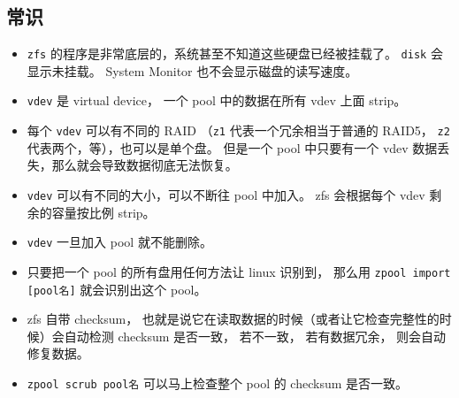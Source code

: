 \subsection{常识}
\begin{itemize}
\item \verb|zfs| 的程序是非常底层的，系统甚至不知道这些硬盘已经被挂载了。 \verb|disk| 会显示未挂载。 System Monitor 也不会显示磁盘的读写速度。
\item \verb|vdev| 是 virtual device， 一个 pool 中的数据在所有 vdev 上面 strip。
\item 每个 \verb|vdev| 可以有不同的 RAID （\verb|z1| 代表一个冗余相当于普通的 RAID5， \verb|z2| 代表两个，等），也可以是单个盘。 但是一个 pool 中只要有一个 vdev 数据丢失，那么就会导致数据彻底无法恢复。
\item \verb|vdev| 可以有不同的大小，可以不断往 pool 中加入。 zfs 会根据每个 vdev 剩余的容量按比例 strip。
\item \verb|vdev| 一旦加入 pool 就不能删除。
\item 只要把一个 pool 的所有盘用任何方法让 linux 识别到， 那么用 \verb|zpool import [pool名]| 就会识别出这个 pool。
\item zfs 自带 checksum， 也就是说它在读取数据的时候（或者让它检查完整性的时候）会自动检测 checksum 是否一致， 若不一致， 若有数据冗余， 则会自动修复数据。
\item \verb|zpool scrub pool名| 可以马上检查整个 pool 的 checksum 是否一致。
\end{itemize}

